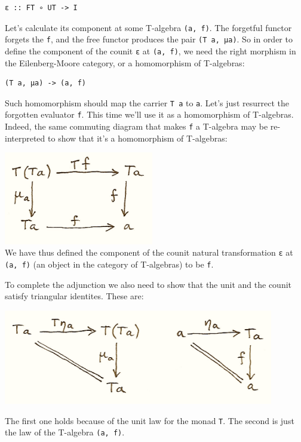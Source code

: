 \begin{verbatim}
ε :: FT ∘ UT -> I
\end{verbatim}

Let's calculate its component at some T-algebra \texttt{(a,\ f)}. The
forgetful functor forgets the \texttt{f}, and the free functor produces
the pair \texttt{(T\ a,\ μa)}. So in order to define the component of
the counit \texttt{ε} at \texttt{(a,\ f)}, we need the right morphism in
the Eilenberg-Moore category, or a homomorphism of T-algebras:

\begin{verbatim}
(T a, μa) -> (a, f)
\end{verbatim}

Such homomorphism should map the carrier \texttt{T\ a} to \texttt{a}.
Let's just resurrect the forgotten evaluator \texttt{f}. This time we'll
use it as a homomorphism of T-algebras. Indeed, the same commuting
diagram that makes \texttt{f} a T-algebra may be re-interpreted to show
that it's a homomorphism of T-algebras:

\includegraphics[width=2.57292in]{images/talg31.png}\\
We have thus defined the component of the counit natural transformation
\texttt{ε} at \texttt{(a,\ f)} (an object in the category of T-algebras)
to be \texttt{f}.

To complete the adjunction we also need to show that the unit and the
counit satisfy triangular identites. These are:

\includegraphics[width=4.64583in]{images/talg4.png}

The first one holds because of the unit law for the monad \texttt{T}.
The second is just the law of the T-algebra \texttt{(a,\ f)}.


